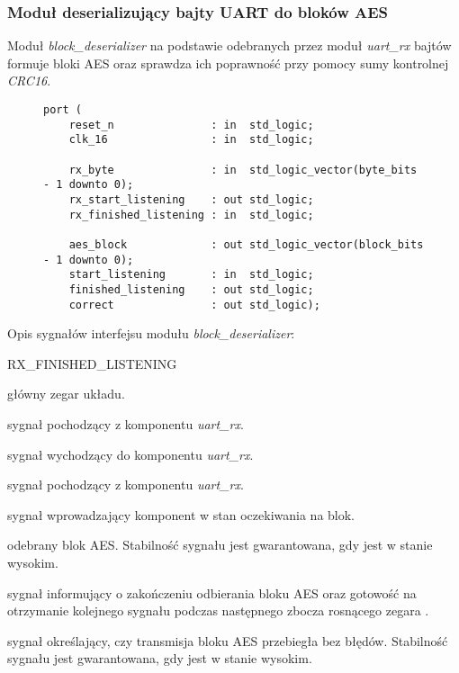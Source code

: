 \subsubsection{Moduł deserializujący bajty UART do bloków AES}
\label{sec:block-deserializer}
Moduł \textit{block\_deserializer} na podstawie odebranych przez moduł \textit{uart\_rx} bajtów formuje bloki AES oraz sprawdza ich poprawność przy pomocy sumy kontrolnej \textit{CRC16}.

\begin{figure}[!h]
\begin{lstlisting}[style=vhdl, captionpos=b, caption={\textit{block\_deserializer} -- interfejs modułu}]
port (
	reset_n               : in  std_logic;
	clk_16                : in  std_logic;

	rx_byte               : in  std_logic_vector(byte_bits - 1 downto 0);
	rx_start_listening    : out std_logic;
	rx_finished_listening : in  std_logic;

	aes_block             : out std_logic_vector(block_bits - 1 downto 0);
	start_listening       : in  std_logic;
	finished_listening    : out std_logic;
	correct               : out std_logic);
\end{lstlisting}
\end{figure}

Opis sygnałów interfejsu modułu \textit{block\_deserializer}:
\begin{interface}{RX\_FINISHED\_LISTENING}
	\item[\insignal{CLK\_16}] główny zegar układu.

	\item[\insignal{RX\_BYTE[7:0]}] sygnał pochodzący z komponentu \textit{uart\_rx}.
	\item[\outsignal{RX\_START\_LISTENING}] sygnał wychodzący do komponentu \textit{uart\_rx}.
	\item[\insignal{RX\_FINISHED\_LISTENING}] sygnał pochodzący z komponentu \textit{uart\_rx}.

	\item[\insignal{START\_LISTENING}] sygnał wprowadzający komponent w stan oczekiwania na blok.
	\item[\outsignal{AES\_BLOCK[127:0]}] odebrany blok AES. Stabilność sygnału jest gwarantowana, gdy  jest w stanie wysokim.
	\item[\outsignal{FINISHED\_LISTENING}] sygnał informujący o zakończeniu odbierania bloku AES oraz gotowość na otrzymanie kolejnego sygnału  podczas następnego zbocza rosnącego zegara .
	\item[\outsignal{CORRECT}] sygnał określający, czy transmisja bloku AES przebiegła bez błędów. Stabilność sygnału jest gwarantowana, gdy  jest w stanie wysokim.
\end{interface}

